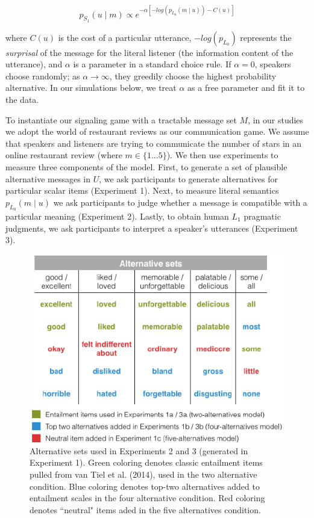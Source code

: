 \documentclass[10pt, letterpaper]{article}
\newenvironment{CodeChunk}{}{}
\begin{document}
\[p_{S_1}(u \mid m) \propto e^{-\alpha[-log(p_{L_0}(m \mid u)) - C(u)]} \tag{3}\]

\noindent where \(C(u)\) is the cost of a particular utterance,
\(-log(p_{L_0})\) represents the \emph{surprisal} of the message for the
literal listener (the information content of the utterance), and
\(\alpha\) is a parameter in a standard choice rule. If \(\alpha=0\),
speakers choose randomly; as \(\alpha \rightarrow \infty\), they
greedily choose the highest probability alternative. In our simulations
below, we treat \(\alpha\) as a free parameter and fit it to the data.

To instantiate our signaling game with a tractable message set \(M\), in
our studies we adopt the world of restaurant reviews as our
communication game. We assume that speakers and listeners are trying to
communicate the number of stars in an online restaurant review (where
\(m \in \{1...5\}\)). We then use experiments to measure three
components of the model. First, to generate a set of plausible
alternative messages in \(U\), we ask participants to generate
alternatives for particular scalar items (Experiment 1). Next, to
measure literal semantics \({p_{L_0} (m \mid u)}\) we ask participants
to judge whether a message is compatible with a particular meaning
(Experiment 2). Lastly, to obtain human \(L_1\) pragmatic judgments, we
ask participants to interpret a speaker's utterances (Experiment 3).

\begin{CodeChunk}
\begin{figure}[t]
\includegraphics{figs/allScalesTable-1} \caption[Alternative sets used in Experiments 2 and 3 (generated in Experiment 1)]{Alternative sets used in Experiments 2 and 3 (generated in Experiment 1). Green coloring denotes classic entailment items pulled from van Tiel et al. (2014), used in the two alternative condition. Blue coloring denotes top-two alternatives added to entailment scales in the four alternative condition. Red coloring denotes ``neutral" items aded in the five alternatives condition.}\label{fig:allScalesTable}
\end{figure}
\end{CodeChunk}
\end{document}
